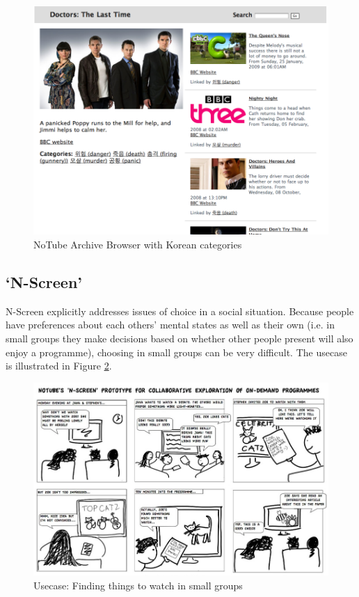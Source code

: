 \documentclass{notube}
\begin{document}
\begin{figure}[htbp]
\begin{center}
\includegraphics[width=5in]{images/korlex.png}
\caption{NoTube Archive Browser with Korean categories} \label{fig:korlex}
\end{center}
\end{figure} 

\subsection{`N-Screen'}

N-Screen explicitly addresses issues of choice in a social situation. Because people have preferences about each others' mental states as well as their own (i.e. in small groups they make decisions based on whether other people present will also enjoy a programme), choosing in small groups can be very difficult. The usecase is illustrated in Figure \ref{fig:nscreen_usecase}.

\begin{figure}[htbp]
\begin{center}
\includegraphics[width=5in]{images/nscreen_usecase.jpg}
\caption{Usecase: Finding things to watch in small groups} \label{fig:nscreen_usecase}
\end{center}
\end{figure} 
\end{document}
